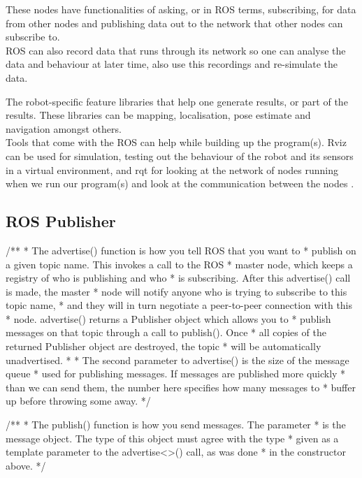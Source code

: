 These nodes have functionalities of asking, or in ROS terms, subscribing, for data from other nodes and publishing data out to the network that other nodes can subscribe to.\\

ROS can also record data that runs through its network so one can analyse the data and behaviour at later time, also use this recordings and re-simulate the data.

The robot-specific feature libraries that help one generate results, or part of the results. These libraries can be mapping, localisation, pose estimate and navigation amongst others.\\


Tools that come with the ROS can help while building up the program(s). Rviz can be used for simulation, testing out the behaviour of the robot and its sensors in a virtual environment, and rqt for looking at the network of nodes running when we run our program(s) and look at the communication between the nodes \cite{ros_core_components}.

\subsection{ROS Publisher}

\iffalse
  /**
   * The advertise() function is how you tell ROS that you want to
   * publish on a given topic name. This invokes a call to the ROS
   * master node, which keeps a registry of who is publishing and who
   * is subscribing. After this advertise() call is made, the master
   * node will notify anyone who is trying to subscribe to this topic name,
   * and they will in turn negotiate a peer-to-peer connection with this
   * node.  advertise() returns a Publisher object which allows you to
   * publish messages on that topic through a call to publish().  Once
   * all copies of the returned Publisher object are destroyed, the topic
   * will be automatically unadvertised.
   *
   * The second parameter to advertise() is the size of the message queue
   * used for publishing messages.  If messages are published more quickly
   * than we can send them, the number here specifies how many messages to
   * buffer up before throwing some away.
   */
   
    /**
    * The publish() function is how you send messages. The parameter
    * is the message object. The type of this object must agree with the type
    * given as a template parameter to the advertise<>() call, as was done
    * in the constructor above.
    */
    
